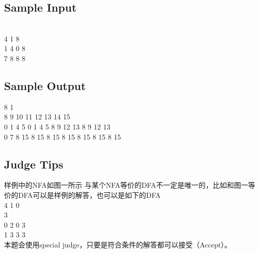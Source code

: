 \subsection{Sample Input}

\\4 1 8
\\1 4 0 8
\\7 8 8 8
\subsection{Sample Output}
 8 1
\\8 9 10 11 12 13 14 15
\\0 1 4 5 0 1 4 5 8 9 12 13 8 9 12 13
\\0 7 8 15 8 15 8 15 8 15 8 15 8 15 8 15
\subsection{Judge Tips}
样例中的NFA如图一所示
与某个NFA等价的DFA不一定是唯一的，比如和图一等价的DFA可以是样例的解答，也可以是如下的DFA
\\4 1 0
\\3
\\0 2 0 3
\\1 3 3 3
\\本题会使用special judge，只要是符合条件的解答都可以接受（Accept）。